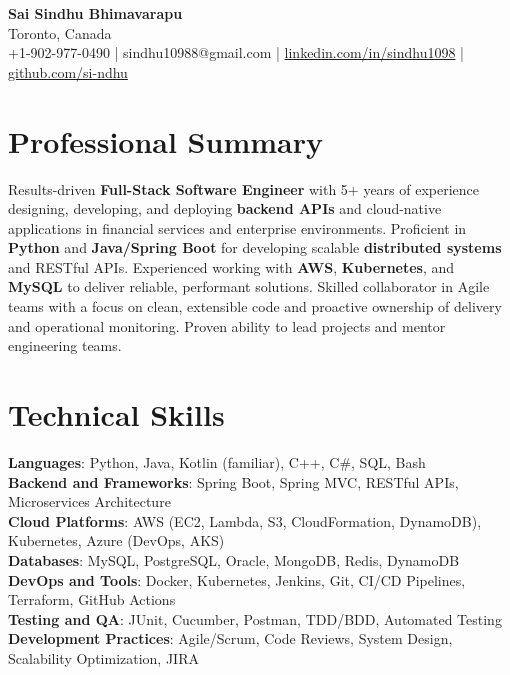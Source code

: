 \documentclass[letterpaper,11pt]{article}
\begin{document}
\begin{center}
  {\Large \textbf{Sai Sindhu Bhimavarapu}} \\
  Toronto, Canada \\
  +1-902-977-0490 \enspace | \enspace sindhu10988@gmail.com \enspace | \enspace \href{https://www.linkedin.com/in/sindhu1098/}{linkedin.com/in/sindhu1098} \enspace | \enspace \href{https://github.com/si-ndhu}{github.com/si-ndhu}
\end{center}

\section{Professional Summary}
  \begin{itemize}[leftmargin=0.15in, label={}]
    \small{\item{
     Results-driven \textbf{Full-Stack Software Engineer} with 5+ years of experience designing, developing, and deploying \textbf{backend APIs} and cloud-native applications in financial services and enterprise environments. Proficient in \textbf{Python} and \textbf{Java/Spring Boot} for developing scalable \textbf{distributed systems} and RESTful APIs. Experienced working with \textbf{AWS}, \textbf{Kubernetes}, and \textbf{MySQL} to deliver reliable, performant solutions. Skilled collaborator in Agile teams with a focus on clean, extensible code and proactive ownership of delivery and operational monitoring. Proven ability to lead projects and mentor engineering teams.
    }}
  \end{itemize}
\vspace{-16pt}

\section{Technical Skills}
 \begin{itemize}[leftmargin=0.15in, label={}]
    \small{\item{
     \textbf{Languages}: Python, Java, Kotlin (familiar), C++, C\#, SQL, Bash \\
     \textbf{Backend and Frameworks}: Spring Boot, Spring MVC, RESTful APIs, Microservices Architecture \\
     \textbf{Cloud Platforms}: AWS (EC2, Lambda, S3, CloudFormation, DynamoDB), Kubernetes, Azure (DevOps, AKS) \\
     \textbf{Databases}: MySQL, PostgreSQL, Oracle, MongoDB, Redis, DynamoDB \\
     \textbf{DevOps and Tools}: Docker, Kubernetes, Jenkins, Git, CI/CD Pipelines, Terraform, GitHub Actions \\
     \textbf{Testing and QA}: JUnit, Cucumber, Postman, TDD/BDD, Automated Testing \\
     \textbf{Development Practices}: Agile/Scrum, Code Reviews, System Design, Scalability Optimization, JIRA
    }}
 \end{itemize}
\vspace{-16pt}
\end{document}
